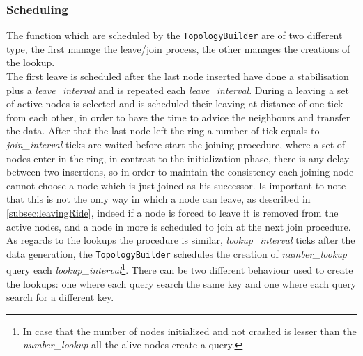 \documentclass[11pt,twocolumn,letterpaper]{article}
\begin{document}
	\subsubsection{Scheduling}
	The function which are scheduled by the \texttt{TopologyBuilder} are of two different type, the first manage the leave/join process, the other manages the creations of the lookup.\\
	The first leave is scheduled after the last node inserted have done a stabilisation plus a \textit{leave\_interval} and is repeated each \textit{leave\_interval}. During a leaving a set of active nodes is selected and is scheduled their leaving at distance of one tick from each other, in order to have the time to advice the neighbours and transfer the data. After that the last node left the ring a number of tick equals to \textit{join\_interval} ticks are waited before start the joining procedure, where a set of nodes enter in the ring, in contrast to the initialization phase, there is any delay between two insertions, so in order to maintain the consistency each joining node cannot choose a node which is just joined as his successor.
	Is important to note that this is not the only way in which a node can leave, as described in \cref{subsec:leavingRide}, indeed if a node is forced to leave it is removed from the active nodes, and a node in more is scheduled to join at the next join procedure.\\
	As regards to the lookups the procedure is similar, \textit{lookup\_interval} ticks after the data generation, the \texttt{TopologyBuilder} schedules the creation of \textit{number\_lookup} query each \textit{lookup\_interval}\footnote{In case that the number of nodes initialized and not crashed is lesser than the \textit{number\_lookup} all the alive nodes create a query.}. There can be two different behaviour used to create the lookups: one where each query search the same key and one where each query search for a different key.
	
	
\end{document}
